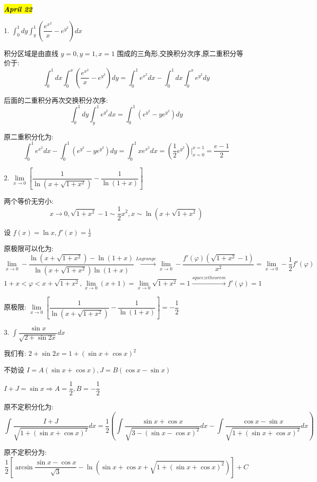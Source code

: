 
\hl{\textbf{\textit{April 22}}}

1. $\int_{0}^{1}dy\int_{y}^{1}(\dfrac{e^{x^2}}{x}-e^{y^2})dx$
\begin{solution}
	
	积分区域是由直线 $y=0,y=1,x=1$ 围成的三角形,交换积分次序,原二重积分等价于: 
	$$\int_{0}^{1}dx\int_{0}^{x}(\dfrac{e^{x^2}}{x}-e^{y^2})dy=\int_{0}^{1}e^{x^2}dx-\int_{0}^{1}dx\int_{0}^{x}e^{y^2}dy$$
	
	后面的二重积分再次交换积分次序: 
	$$\int_{0}^{1}dy\int_{y}^{1}e^{y^2}dx=\int_{0}^{1}(e^{y^2}-ye^{y^2})dy$$
	
	原二重积分化为: 
	$$\int_{0}^{1}e^{x^2}dx-\int_{0}^{1}(e^{y^2}-ye^{y^2})dy=\int_{0}^{1}xe^{x^2}dx=(\frac{1}{2}e^{y^2})|_{x=0}^{x=1}=\dfrac{e-1}{2}$$
\end{solution}


2. $\lim\limits_{x\rightarrow 0}\left[ \dfrac{1}{\ln(x+\sqrt{1+x^2})}-\dfrac{1}{\ln(1+x)}\right] $
\begin{solution}
	
	两个等价无穷小:  $$x\rightarrow 0,\sqrt{1+x^{2}}-1\sim \dfrac{1}{2}x^{2}, x\sim \ln(x+\sqrt{1+x^2})$$
	
	设 $f(x)=\ln x,f'(x)=\frac{1}{x}$
	
	原极限可以化为: 
	$$\lim\limits_{x\rightarrow 0}-\frac{\ln(x+\sqrt{1+x^2})-\ln(1+x)}{\ln(x+\sqrt{1+x^2})\ln(1+x)}\stackrel{Lagrange}{\longrightarrow}\lim\limits_{x\rightarrow 0}-\frac{f'(\varphi)(\sqrt{1+x^2}-1)}{x^2}=\lim\limits_{x\rightarrow 0}-\frac{1}{2}f'(\varphi)$$
	$$1+x<\varphi<x+\sqrt{1+x^2},\lim\limits_{x\rightarrow 0}(x+1)=\lim\limits_{x\rightarrow 0}\sqrt{1+x^2}=1\stackrel{squeeze theorem}{\longrightarrow} f'(\varphi)=1$$
	
	原极限: $\lim\limits_{x\rightarrow 0}\left[ \dfrac{1}{\ln(x+\sqrt{1+x^2})}-\dfrac{1}{\ln(1+x)}\right] =-\dfrac{1}{2}$
	
\end{solution}


3. $\int\dfrac{\sin x}{\sqrt{2+\sin 2x}}dx$\label{problem: 组合积分法}

\begin{solution}
	
	我们有: $2+\sin 2x=1+(\sin x+\cos x)^2$
	
	不妨设 $I=A(\sin x+\cos x),J=B(\cos x-\sin x)$ 
	
	$ I+J=\sin x\Rightarrow A=\dfrac{1}{2},B=-\dfrac{1}{2}$
	
	原不定积分化为: 
	$$\int\frac{I+J}{\sqrt{1+(\sin x+\cos x)^2}}dx=\frac{1}{2}\left( \int\frac{\sin x+\cos x}{\sqrt{3-(\sin x-\cos x)^2}}dx-\int\frac{\cos x-\sin x}{\sqrt{1+(\sin x+\cos x)^2}}dx\right)$$
	
	原不定积分为: 
	$$\dfrac{1}{2}\left[ \arcsin \frac{\sin x-\cos x}{\sqrt{3}}-\ln(\sin x+\cos x+\sqrt{1+(\sin x+\cos x)^2} )\right] +C$$
\end{solution}

